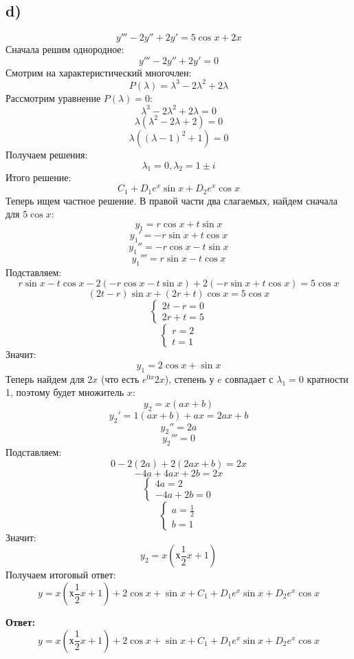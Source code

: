 \documentclass[a4paper, 12pt]{article}
\begin{document}
\subsection*{d)}
\[
y''' -2 y'' + 2y' = 5 \cos x + 2x 
\]
Сначала решим однородное:
\[
y''' -2 y'' + 2y' = 0
\]
Смотрим на характеристический многочлен:
\[
P(\lambda) = \lambda^3 - 2 \lambda^2 + 2 \lambda 
\]
Рассмотрим уравнение $P(\lambda) = 0$:
\[
\lambda^3 - 2 \lambda^2 + 2 \lambda  = 0
\]
\[
\lambda(\lambda^2 - 2\lambda+ 2) = 0
\]
\[
\lambda( (\lambda -1)^2 +  1) = 0
\]
Получаем решения:
\[
\lambda_1 = 0, \lambda_2 = 1 \pm i
\]
Итого решение:
\[
C_1 + D_1 e^x \sin x + D_2  e^x\cos x
\]
Теперь ищем частное решение. В правой части два слагаемых, найдем сначала для $5\cos x$:
\[
y_1 = r \cos x + t \sin x
\]
\[
y_1' = -r \sin x + t \cos x
\]
\[
y_1'' = -r \cos x -t \sin x 
\]
\[
y_1''' = r \sin x - t \cos x
\]
Подставляем:
\[
r \sin x - t \cos x - 2(-r \cos x -t \sin x ) + 2(-r \sin x + t \cos x) = 5 \cos x
\]
\[
(2t - r) \sin x + (2r + t) \cos x = 5 \cos x
\]
\[
\begin{cases}
2t - r = 0 \\
2r + t = 5
\end{cases}
\]
\[
\begin{cases}
r = 2\\
t = 1
\end{cases}
\]
Значит:
\[
y_1 = 2 \cos x + \sin x
\]
Теперь найдем для $2x$ (что есть $e^{0x} 2x$), степень у $e$ совпадает с $\lambda_1 = 0$ кратности 1, поэтому будет множитель $x$:
\[
y_2 = x(ax + b) 
\]
\[
y_2' = 1(ax +b) + ax = 2ax + b
\]
\[
y_2'' = 2a
\]
\[
y_2''' = 0
\]
Подставляем:
\[
0 - 2(2a) + 2(2ax +b) = 2x
\]
\[
-4a + 4ax + 2b = 2x
\]
\[
\begin{cases}
4a = 2 \\
-4 a + 2b = 0
\end{cases}
\]
\[
\begin{cases}
a = \frac{1}{2}\\
b = 1
\end{cases}
\]
Значит:
\[
y_2 = x\left(х\frac{1}{2}x + 1\right) 
\]
Получаем итоговый ответ:
\[
y = x\left(х\frac{1}{2}x + 1\right)  + 2 \cos x + \sin x + C_1 + D_1 e^x \sin x + D_2  e^x\cos x
\]
\begin{center}
\textbf{Ответ: } 
\[
y = x\left(х\frac{1}{2}x + 1\right)  + 2 \cos x + \sin x + C_1 + D_1 e^x \sin x + D_2  e^x\cos x
\]
\end{center}
\clearpage
\end{document}
